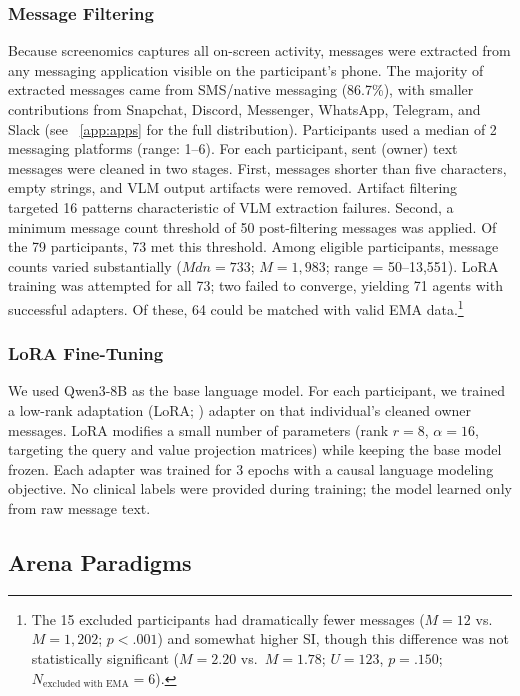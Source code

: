 \documentclass[review,12pt,authoryear]{elsarticle}
\begin{document}
\subsubsection{Message Filtering}

Because screenomics captures all on-screen activity, messages were extracted from any messaging application visible on the participant's phone. The majority of extracted messages came from SMS/native messaging (86.7\%), with smaller contributions from Snapchat, Discord, Messenger, WhatsApp, Telegram, and Slack (see ~\ref{app:apps} for the full distribution). Participants used a median of 2 messaging platforms (range: 1--6). For each participant, sent (owner) text messages were cleaned in two stages. First, messages shorter than five characters, empty strings, and VLM output artifacts were removed. Artifact filtering targeted 16 patterns characteristic of VLM extraction failures. Second, a minimum message count threshold of 50 post-filtering messages was applied. Of the 79 participants, 73 met this threshold. Among eligible participants, message counts varied substantially ($Mdn = 733$; $M = 1{,}983$; range = 50--13,551). LoRA training was attempted for all 73; two failed to converge, yielding 71 agents with successful adapters. Of these, 64 could be matched with valid EMA data.\footnote{The 15 excluded participants had dramatically fewer messages ($M = 12$ vs.\ $M = 1{,}202$; $p < .001$) and somewhat higher SI, though this difference was not statistically significant ($M = 2.20$ vs.\ $M = 1.78$; $U = 123$, $p = .150$; $N_{\text{excluded with EMA}} = 6$).}

\subsubsection{LoRA Fine-Tuning}

We used Qwen3-8B \citep{qwen2025qwen3} as the base language model. For each participant, we trained a low-rank adaptation (LoRA; \citealt{hu2022lora}) adapter on that individual's cleaned owner messages. LoRA modifies a small number of parameters (rank $r = 8$, $\alpha = 16$, targeting the query and value projection matrices) while keeping the base model frozen. Each adapter was trained for 3 epochs with a causal language modeling objective. No clinical labels were provided during training; the model learned only from raw message text.

\subsection{Arena Paradigms}
\end{document}
